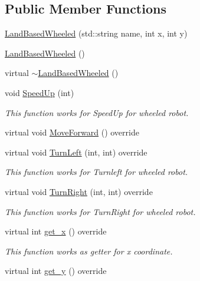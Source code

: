 \subsection*{Public Member Functions}
\begin{DoxyCompactItemize}
\item 
\hyperlink{classfp_1_1_land_based_wheeled_ad2b73f9998381dafa6b4a0388acfc28c}{Land\+Based\+Wheeled} (std\+::string name, int x, int y)
\item 
\hyperlink{classfp_1_1_land_based_wheeled_a83884c16bfa5a6153958fd75d509123b}{Land\+Based\+Wheeled} ()
\item 
virtual \hyperlink{classfp_1_1_land_based_wheeled_a87d1d6bf36315ef9dbc79750a968fa2e}{$\sim$\+Land\+Based\+Wheeled} ()
\item 
void \hyperlink{classfp_1_1_land_based_wheeled_a8fc1115e4c49fec71b38a520df4d1528}{Speed\+Up} (int)
\begin{DoxyCompactList}\small\item\em This function works for Speed\+Up for wheeled robot. \end{DoxyCompactList}\item 
virtual void \hyperlink{classfp_1_1_land_based_wheeled_af7875b805655b6f654e49a885f31122a}{Move\+Forward} () override
\item 
virtual void \hyperlink{classfp_1_1_land_based_wheeled_a2f2434db907aaef26b8f3084e84b3579}{Turn\+Left} (int, int) override
\begin{DoxyCompactList}\small\item\em This function works for Turnleft for wheeled robot. \end{DoxyCompactList}\item 
virtual void \hyperlink{classfp_1_1_land_based_wheeled_ac6e93b00e624e281a497e99729db04e7}{Turn\+Right} (int, int) override
\begin{DoxyCompactList}\small\item\em This function works for Turn\+Right for wheeled robot. \end{DoxyCompactList}\item 
virtual int \hyperlink{classfp_1_1_land_based_wheeled_a75cb4df0270397db3a019f1abc694cf9}{get\+\_\+x} () override
\begin{DoxyCompactList}\small\item\em This function works as getter for x coordinate. \end{DoxyCompactList}\item 
virtual int \hyperlink{classfp_1_1_land_based_wheeled_ae793757fd11ba270a6d9c335acb8cafd}{get\+\_\+y} () override

\end{DoxyCompactItemize}
